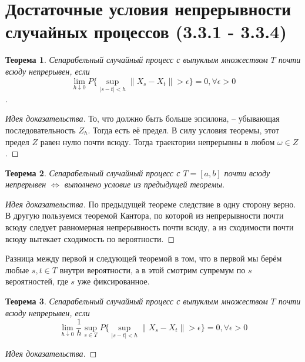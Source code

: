 \documentclass[16pt]{article}
\newtheorem{theorem}{Теорема}[section]
\theoremstyle{definition}
\begin{document}
\section{Достаточные условия непрерывности случайных процессов (3.3.1 - 3.3.4)}
\begin{theorem}
Сепарабельный случайный процесс с выпуклым множеством $T$ почти всюду непрерывен, если $$\lim_{h \downarrow 0}P\{\sup_{|s - t| < h} \|X_s - X_t\| > \epsilon\} = 0, \forall \epsilon > 0$$.
\end{theorem}
\begin{proof}[Идея доказательства]
То, что должно быть больше эпсилона, -- убывающая последовательность $Z_h$. Тогда есть её предел. В силу условия теоремы, этот предел $Z$ равен нулю почти всюду. Тогда траектории непрерывны в любом $\omega \in Z$.
\end{proof}
\begin{theorem}
Сепарабельный случайный процесс с $T = [a, b]$ почти всюду непрерывен $\Longleftrightarrow$ выполнено условие из предыдущей теоремы.
\end{theorem}
\begin{proof}[Идея доказательства]
По предыдущей теореме следствие в одну сторону верно. В другую пользуемся теоремой Кантора, по которой из непрерывности почти всюду следует равномерная непрерывность почти всюду, а из сходимости почти всюду вытекает сходимость по вероятности.
\end{proof}
Разница между первой и следующей теоремой в том, что в первой мы берём любые $s, t \in T$ внутри вероятности, а в этой смотрим супремум по $s$ вероятностей, где $s$ уже фиксированное.
\begin{theorem}
Сепарабельный случайный процесс с выпуклым множеством $T$ почти всюду непрерывен, если $$\lim_{h \downarrow 0}\frac{1}{h}\sup_{s \in T}P\{\sup_{|s - t| < h} \|X_s - X_t\| > \epsilon\} = 0, \forall \epsilon > 0$$
\end{theorem}
\begin{proof}[Идея доказательства]

\end{proof}
\end{document}
